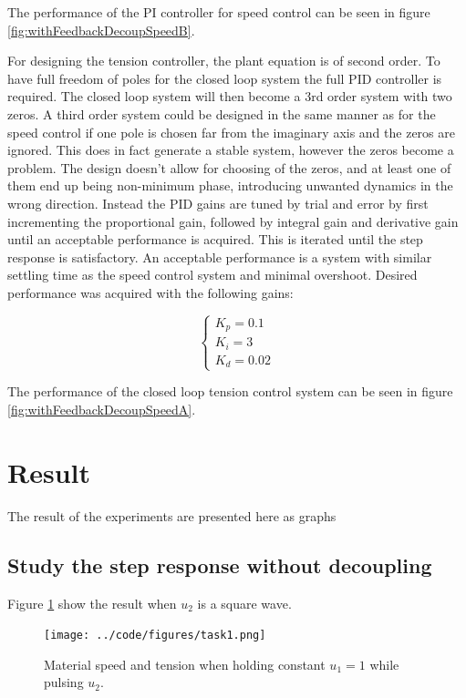 \documentclass[a4paper, titlepage]{article}
\begin{document}
The performance of the PI controller for speed control can be seen in figure \ref{fig:withFeedbackDecoupSpeedB}.

For designing the tension controller, the plant equation is of second order.
To have full freedom of poles for the closed loop system the full PID controller is required.
The closed loop system will then become a 3rd order system with two zeros.
A third order system could be designed in the same manner as for the speed control if one pole is chosen far from the imaginary axis and the zeros are ignored.
This does in fact generate a stable system, however the zeros become a problem.
The design doesn't allow for choosing of the zeros, and at least one of them end up being non-minimum phase, introducing unwanted dynamics in the wrong direction.
Instead the PID gains are tuned by trial and error by first incrementing the proportional gain, followed by integral gain and derivative gain until an acceptable performance is acquired.
This is iterated until the step response is satisfactory.
An acceptable performance is a system with similar settling time as the speed control system and minimal overshoot.
Desired performance was acquired with the following gains:

\begin{equation}
\begin{cases}
K_p = 0.1 \\ K_i = 3 \\ K_d = 0.02
\end{cases}
\end{equation}

The performance of the closed loop tension control system can be seen in figure \ref{fig:withFeedbackDecoupSpeedA}.


\section{Result}
The result of the experiments are presented here as graphs
\subsection{Study the step response without decoupling}
Figure \ref{fig:withoutDecoup} show the result when $u_2$ is a square wave. 

\begin{figure}[H]
\center
\texttt{[image: ../code/figures/task1.png]}
\caption{Material speed and tension when holding constant $u_1 = 1$ while pulsing $u_2$.}
\label{fig:withoutDecoup}
\end{figure}
\end{document}

